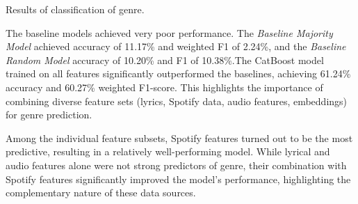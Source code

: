 \begin{table}[H]
\centering
\caption{Results of classification of genre.}
\end{table}

The baseline models achieved very poor performance. The \textit{Baseline
Majority Model} achieved accuracy of 11.17\% and weighted F1 of 2.24\%, and the
\textit{Baseline Random Model} accuracy of 10.20\% and F1 of 10.38\%.The
CatBoost model trained on all features significantly outperformed the
baselines, achieving 61.24\% accuracy and 60.27\% weighted F1-score. This
highlights the importance of combining diverse feature sets (lyrics, Spotify
data, audio features, embeddings) for genre prediction.

Among the individual feature subsets, Spotify features turned out to be the
most predictive, resulting in a relatively well-performing model. While lyrical
and audio features alone were not strong predictors of genre, their combination
with Spotify features significantly improved the model's performance,
highlighting the complementary nature of these data sources.





